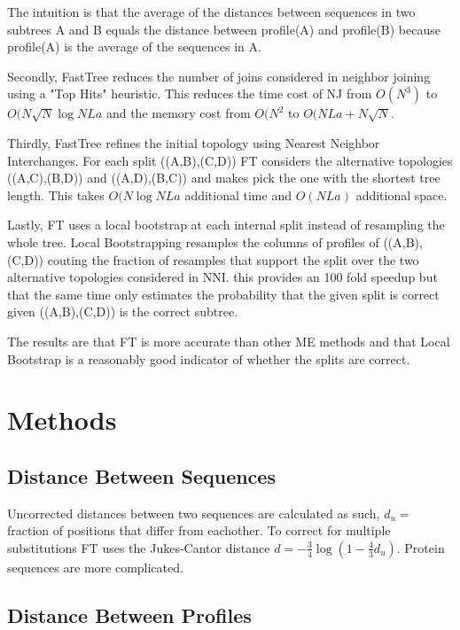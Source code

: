 \documentclass[a4paper]{article}
\begin{document}
The intuition is that the average of the distances between sequences in two subtrees A and B equals the distance between profile(A) and profile(B) because  profile(A) is the average of the sequences in A.

Secondly, FastTree reduces the number of joins considered in neighbor joining using a "Top Hits" heuristic. This reduces the time cost of NJ from \(O(N^3)\)  to \(O(N\sqrt{N}\log{N}La\) and 
the memory cost from \(O(N^2\) to \(O(NLa + N\sqrt{N}\). 

Thirdly, FastTree refines the initial topology using Nearest Neighbor Interchanges. For each split ((A,B),(C,D)) FT considers the alternative topologies ((A,C),(B,D)) and ((A,D),(B,C)) and makes pick the one with the shortest tree length. This takes \(O(N\log{N}La\) additional time and \(O(NLa)\) additional space. 

Lastly, FT uses a local bootstrap at each internal split instead of resampling the whole tree. Local Bootstrapping resamples the columns of profiles of ((A,B),(C,D)) couting the fraction of resamples that support the split over the two alternative topologies considered in NNI. this provides an 100 fold speedup but that the same time only estimates the probability that the given split is correct given ((A,B),(C,D)) is the correct subtree. 

The results are that FT is more accurate than other ME methods and that Local Bootstrap is a reasonably good indicator of whether the splits are correct. 

\section{Methods}

\subsection{Distance Between Sequences}

Uncorrected distances between two sequences are calculated as such, \(d_u =\) fraction of positions that differ from eachother. To correct for multiple substitutions FT uses the Jukes-Cantor distance \(d = -\frac{3}{4}\log{(1-\frac{4}{3}d_u)} \). Protein sequences are more complicated. 

\subsection{Distance Between Profiles}
\end{document}
